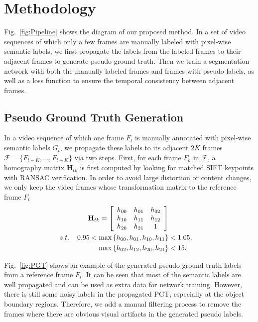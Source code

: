 \section{Methodology}
\label{sec:metho}

Fig.~\ref{fig:Pipeline} shows the diagram of our proposed method. 
In a set of video sequences of which only a few frames are manually labeled with pixel-wise semantic labels, we first propagate the labels from the labeled frames to their adjacent frames to generate pseudo ground truth. 
Then we train a segmentation network with both the manually labeled frames and frames with pseudo labels, as well as a loss function to ensure the temporal consistency between adjacent frames.

\subsection{Pseudo Ground Truth Generation}
%
In a video sequence of which one frame $F_t$ is manually annotated with pixel-wise semantic labels $G_t$, we propagate these labels to its adjacent $2K$ frames $\mathcal{F}=\{F_{t-K},\ldots, F_{t+K}\}$ via two steps.
%
First, for each frame $F_k$ in $\mathcal{F}$, a homography matrix $\mathbf{H}_{tk}$ is first computed by looking for matched SIFT keypoints with RANSAC verification.
%
In order to avoid large distortion or content changes, we only keep the video frames whose transformation matrix to the reference frame $F_t$
% 
\begin{equation}
\centering
\begin{aligned}
\mathbf{H}_{tk}
=
\left[
\begin{array}{ccc}
h_{00} & h_{01} & h_{02}\\
h_{10} & h_{11} & h_{12}\\
h_{20} & h_{21} & 1\\
\end{array}
\right] \\
s.t. \hspace{0.4cm}0.95<\max{\left\{h_{00},h_{01},h_{10},h_{11}\right\}}&<1.05,\\
\max{\left\{h_{02},h_{12},h_{20},h_{21}\right\}}&<15.\\
\end{aligned}
\end{equation}


Fig.~\ref{fig:PGT} shows an example of the generated pseudo ground truth labels from a reference frame $F_t$. 
It can be seen that most of the semantic labels are well propagated and can be used as extra data for network training. 
% 
However, there is still some noisy labels in the propagated PGT, especially at the object boundary regions. 
%
Therefore, we add a manual filtering process to remove the frames where there are obvious visual artifacts in the generated pseudo labels.
%




